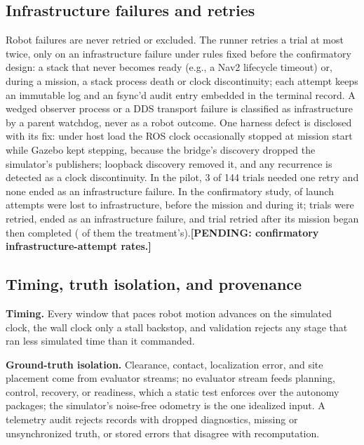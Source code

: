 \documentclass[conference]{IEEEtran}
\newcommand{\pending}[1]{\textbf{[PENDING: #1]}}
\newcommand{\withresults}[2]{\ifdefined\resTrials #1\else #2\fi}
\begin{document}
\subsection{Infrastructure failures and retries}
Robot failures are never retried or excluded. The runner retries a trial at most twice, only on an infrastructure failure under rules fixed before the confirmatory design: a stack that never becomes ready (e.g., a Nav2 lifecycle timeout) or, during a mission, a stack process death or clock discontinuity; each attempt keeps an immutable log and an fsync'd audit entry embedded in the terminal record. A wedged observer process or a DDS transport failure is classified as infrastructure by a parent watchdog, never as a robot outcome. One harness defect is disclosed with its fix: under host load the ROS clock occasionally stopped at mission start while Gazebo kept stepping, because the bridge's discovery dropped the simulator's publishers; loopback discovery removed it, and any recurrence is detected as a clock discontinuity. In the pilot, 3 of 144 trials needed one retry and none ended as an infrastructure failure. \withresults{In the confirmatory study, \resInfraAttempts{} of \resLaunchAttempts{} launch attempts were lost to infrastructure, \resInfraBeforeMission{} before the mission and \resInfraDuringMission{} during it; \resTrialsRetried{} trials were retried, \resInfraFailures{} ended as an infrastructure failure, and \resInfraDuringThenCompleted{} trial retried after its mission began then completed (\resInfraDuringThenCompletedSensing{} of them the treatment's).}{\pending{confirmatory infrastructure-attempt rates.}}

\subsection{Timing, truth isolation, and provenance}
\textbf{Timing.} Every window that paces robot motion advances on the simulated clock, the wall clock only a stall backstop, and validation rejects any stage that ran less simulated time than it commanded.

\textbf{Ground-truth isolation.} Clearance, contact, localization error, and site placement come from evaluator streams; no evaluator stream feeds planning, control, recovery, or readiness, which a static test enforces over the autonomy packages; the simulator's noise-free odometry is the one idealized input. A telemetry audit rejects records with dropped diagnostics, missing or unsynchronized truth, or stored errors that disagree with recomputation.
\end{document}

